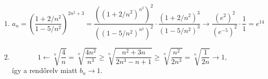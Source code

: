 \documentclass[11pt]{scrartcl}
\begin{document}
\begin{enumerate}
	\item \[
		      a_n
		      = \left( \frac{1 + 2/n^2}{1 - 5/n^2} \right)^{2n^2 + 3}
		      =
		      \frac{\left( \left(1 + 2/n^2\right)^{n^2} \right)^2}{\left( \left(1 - 5/n^2\right)^{n^2} \right)^2}
		      \cdot \frac{\left(1 + 2/n^2\right)^3}{\left(1 - 5/n^2\right)^3}
		      \longrightarrow
		      \frac{\left(e^2\right)^2}{\left(e^{-5}\right)^2} \cdot \frac{1}{1}
		      = e^{14}
	      \]

	\item \[
		      1 \leftarrow \sqrt[n]{\frac{4}{n}}
		      = \sqrt[n]{\frac{4n^2}{n^3}}
		      \ge \sqrt[n]{\frac{n^2 + 3n}{2n^3 - n + 1}}
		      \ge \sqrt[n]{\frac{n^2}{2n^3}}
		      = \sqrt[n]{\frac{1}{2n}} \to 1,
	      \]
	      így a rendőrelv miatt $b_n \to 1$.
\end{enumerate}
\end{document}
